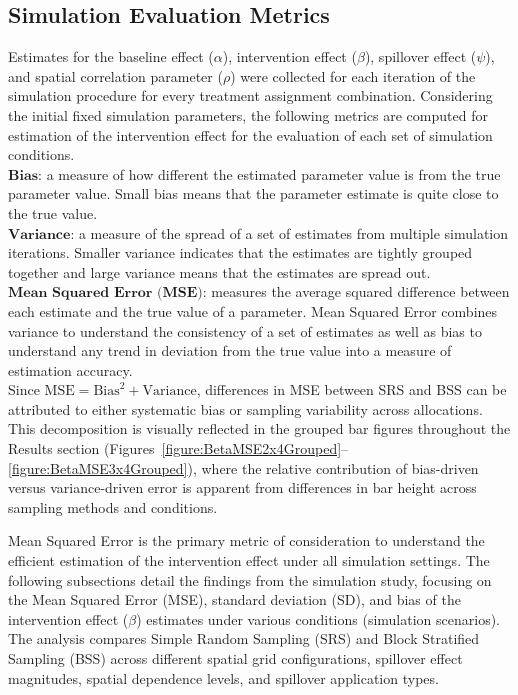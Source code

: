 \documentclass{article}[11pt]
\begin{document}
\subsection{Simulation Evaluation Metrics}

Estimates for the baseline effect ($\alpha$), intervention effect ($\beta$), spillover effect ($\psi$), and spatial correlation parameter ($\rho$) were collected for each iteration of the simulation procedure for every treatment assignment combination. Considering the initial fixed simulation parameters, the following metrics are computed for estimation of the intervention effect for the evaluation of each set of simulation conditions.\\

\noindent $\textbf{Bias}$: a measure of how different the estimated parameter value is from the true parameter value. Small bias means that the parameter estimate is quite close to the true value.\\

\noindent $\textbf{Variance}$: a measure of the spread of a set of estimates from multiple simulation iterations. Smaller variance indicates that the estimates are tightly grouped together and large variance means that the estimates are spread out.\\

\noindent $\textbf{Mean Squared Error (MSE)}$: measures the average squared difference between each estimate and the true value of a parameter. Mean Squared Error combines variance to understand the consistency of a set of estimates as well as bias to understand any trend in deviation from the true value into a measure of estimation accuracy.\\

Since $\text{MSE} = \text{Bias}^2 + \text{Variance}$, differences in MSE between SRS and BSS can be attributed to either systematic bias or sampling variability across allocations. This decomposition is visually reflected in the grouped bar figures throughout the Results section (Figures~\ref{figure:BetaMSE2x4Grouped}--\ref{figure:BetaMSE3x4Grouped}), where the relative contribution of bias-driven versus variance-driven error is apparent from differences in bar height across sampling methods and conditions.

Mean Squared Error is the primary metric of consideration to understand the efficient estimation of the intervention effect under all simulation settings. The following subsections detail the findings from the simulation study, focusing on the Mean Squared Error (MSE), standard deviation (SD), and bias of the intervention effect ($\beta$) estimates under various conditions (simulation scenarios). The analysis compares Simple Random Sampling (SRS) and Block Stratified Sampling (BSS) across different spatial grid configurations, spillover effect magnitudes, spatial dependence levels, and spillover application types.
\end{document}
